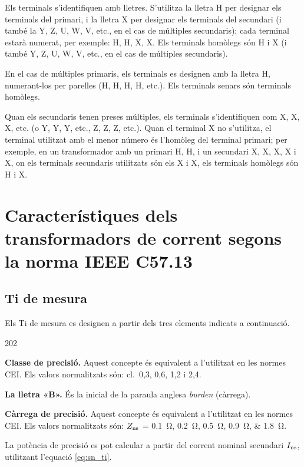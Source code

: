 Els terminals s'identifiquen amb lletres. S'utilitza la lletra H per designar els terminals del primari, i la lletra X per designar els terminals del secundari (i també la Y, Z, U, W, V,  etc.{}, en el cas de múltiples secundaris); cada terminal estarà numerat, per exemple: H, H,  X, X. Els terminals homòlegs són H i X (i també Y, Z, U, W, V, etc.{}, en el cas de múltiples secundaris).

En el cas de múltiples primaris, els terminals es designen amb la lletra H, numerant-los per parelles (H, H, H, H, etc.{}). Els terminals senars són terminals homòlegs.

Quan els secundaris tenen preses múltiples, els terminals s'identifiquen com X, X, X, etc.{} (o Y, Y, Y, etc.{}, Z, Z, Z, etc.{}). Quan el terminal X no s'utilitza, el terminal utilitzat amb el menor número és l'homòleg del terminal primari; per exemple, en un transformador amb un primari H, H, i un secundari  X, X, X, X i X, on els terminals secundaris utilitzats són els X i  X, els terminals homòlegs són H i X.


\section{Característiques dels transformadors de corrent segons la norma IEEE C57.13}


\subsection{Ti de mesura}

Els Ti de mesura  es designen a partir
dels tres elements indicats a continuació.

\begin{dingautolist}{202}
    \item \textbf{Classe de precisió.} Aquest concepte és equivalent
    a l'utilitzat en les normes CEI. Els valors
    normalitzats són: cl.~0,3, 0,6, 1,2 i 2,4.
    \item \textbf{La lletra «B».} És la inicial de la paraula anglesa
    \textit{burden}  (càrrega).
    \item \textbf{Càrrega de precisió.} Aquest concepte és equivalent
    a l'utilitzat en les normes CEI. Els valors
    normalitzats són: $Z_\mathrm{ns}$ = \qtylist{0,1;0,2;0,5;0,9;1,8}{\ohm}.

    La potència de precisió es pot calcular a partir del
    corrent  nominal secundari $I_\mathrm{ns}$, utilitzant l'equació
    \eqref{eq:sn_ti}.
\end{dingautolist}

